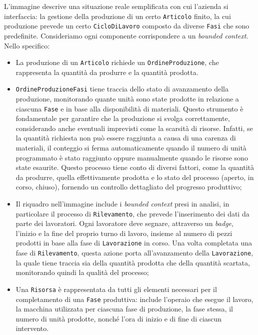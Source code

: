         \vspace{0.2 em}
        \noindent L'immagine descrive una situazione reale semplificata con cui l'azienda si interfaccia: la gestione della produzione di un certo \texttt{Articolo} finito, la cui produzione prevede un certo \texttt{CicloDiLavoro} composto da diverse \texttt{Fasi} che sono predefinite. Consideriamo ogni componente corrispondere a un \textit{bounded context}.
        Nello specifico: 
        \begin{itemize}
            \item La produzione di un \texttt{Articolo} richiede un \texttt{OrdineProduzione}, che rappresenta la quantità da produrre e la quantità prodotta.
            \item \texttt{OrdineProduzioneFasi} tiene traccia dello stato di avanzamento della produzione, monitorando quante unità sono state prodotte in relazione a ciascuna \texttt{Fase} e in base alla disponibilità di materiali. Questo strumento è fondamentale per garantire che la produzione si svolga correttamente, considerando anche eventuali imprevisti come la scarsità di risorse. Infatti, se la quantità richiesta non può essere raggiunta a causa di una carenza di materiali, il conteggio si ferma automaticamente quando il numero di unità programmato è stato raggiunto oppure manualmente quando le risorse sono state esaurite. Questo processo tiene conto di diversi fattori, come la quantità da produrre, quella effettivamente prodotta e lo stato del processo (aperto, in corso, chiuso), fornendo un controllo dettagliato del progresso produttivo;
            \item Il riquadro nell'immagine include i \textit{bounded context} presi in analisi, in particolare il processo di \texttt{Rilevamento}, che prevede l'inserimento dei dati da parte dei lavoratori. Ogni lavoratore deve segnare, attraverso un \textit{badge}, l'inizio e la fine del proprio turno di lavoro, insieme al numero di pezzi prodotti in base alla fase di \texttt{Lavorazione} in corso. Una volta completata una fase di \texttt{Rilevamento}, questa azione porta all'avanzamento della \texttt{Lavorazione}, la quale tiene traccia sia della quantità prodotta che della quantità scartata, monitorando quindi la qualità del processo;
            \item Una \texttt{Risorsa} è rappresentata da tutti gli elementi necessari per il completamento di una \texttt{Fase} produttiva: include l'operaio che esegue il lavoro, la macchina utilizzata per ciascuna fase di produzione, la fase stessa, il numero di unità prodotte, nonché l'ora di inizio e di fine di ciascun intervento.
        \end{itemize}

